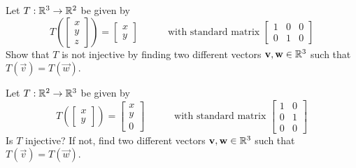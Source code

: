 \begin{applicationActivities}
\begin{activity}{3}
Let $T: \mathbb{R}^3 \rightarrow \mathbb{R}^2$ be given by
\[
  T\left(\begin{bmatrix}x \\ y\\z \end{bmatrix} \right)
    =
  \begin{bmatrix} x \\ y \end{bmatrix}
    \hspace{3em}
    \text{with standard matrix }
  \begin{bmatrix} 1 & 0 & 0 \\ 0 & 1 & 0 \end{bmatrix}
\]
Show that \(T\) is not injective by finding two different vectors
\(\mathbf v,\mathbf w\in\mathbb{R}^3\) such that \(T(\vec v)=T(\vec w)\).
\end{activity}

\begin{activity}{2}
Let $T: \mathbb{R}^2 \rightarrow \mathbb{R}^3$ be given by
\[
  T\left(\begin{bmatrix}x \\ y \end{bmatrix} \right)
    =
  \begin{bmatrix} x \\ y \\ 0 \end{bmatrix}
    \hspace{3em}
    \text{with standard matrix }
  \begin{bmatrix} 1 & 0 \\ 0 & 1 \\ 0 & 0 \end{bmatrix}
\]
Is $T$ injective? If not, find two different vectors
\(\mathbf v,\mathbf w\in\mathbb{R}^3\) such that \(T(\vec v)=T(\vec w)\).
\end{activity}


\end{applicationActivities}
